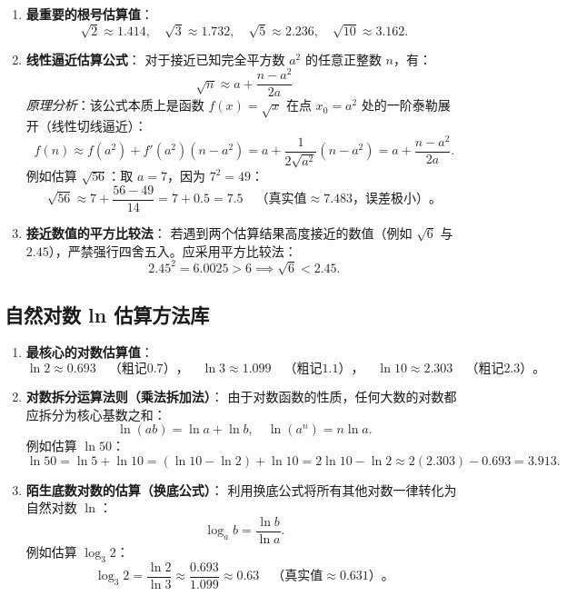 \documentclass[12pt,a4paper]{ctexart}
\begin{document}
\begin{enumerate}[label=\arabic*. , leftmargin=2em, itemsep=1.2em, topsep=0.2em]
  \item \textbf{最重要的根号估算值}：
  \[
  \sqrt{2} \approx 1.414,\quad \sqrt{3} \approx 1.732,\quad \sqrt{5} \approx 2.236,\quad \sqrt{10} \approx 3.162.
  \]
  \item \textbf{线性逼近估算公式}：
  对于接近已知完全平方数 \(a^2\) 的任意正整数 \(n\)，有：
  \[
  \sqrt{n} \approx a + \frac{n - a^2}{2a}
  \]
  \textit{原理分析}：该公式本质上是函数 \(f(x) = \sqrt{x}\) 在点 \(x_0 = a^2\) 处的一阶泰勒展开（线性切线逼近）：
  \[
  f(n) \approx f(a^2) + f'(a^2)(n - a^2) = a + \frac{1}{2\sqrt{a^2}}(n - a^2) = a + \frac{n-a^2}{2a}.
  \]
  例如估算 \(\sqrt{56}\)：取 \(a = 7\)，因为 \(7^2 = 49\)：
  \[
  \sqrt{56} \approx 7 + \frac{56-49}{14} = 7 + 0.5 = 7.5 \quad （真实值 \approx 7.483，误差极小）。
  \]
  \item \textbf{接近数值的平方比较法}：
  若遇到两个估算结果高度接近的数值（例如 \(\sqrt{6}\) 与 \(2.45\)），严禁强行四舍五入。应采用平方比较法：
  \[
  2.45^2 = 6.0025 > 6 \implies \sqrt{6} < 2.45.
  \]
\end{enumerate}

\subsection{自然对数 ln 估算方法库}
\begin{enumerate}[label=\arabic*. , leftmargin=2em, itemsep=1.2em, topsep=0.2em]
  \item \textbf{最核心的对数估算值}：
  \[
  \ln 2 \approx 0.693 \quad （粗记 0.7），\quad \ln 3 \approx 1.099 \quad （粗记 1.1），\quad \ln 10 \approx 2.303 \quad （粗记 2.3）。
  \]
  \item \textbf{对数拆分运算法则（乘法拆加法）}：
  由于对数函数的性质，任何大数的对数都应拆分为核心基数之和：
  \[
  \ln(ab) = \ln a + \ln b,\quad \ln(a^n) = n\ln a.
  \]
  例如估算 \(\ln 50\)：
  \[
  \ln 50 = \ln 5 + \ln 10 = (\ln 10 - \ln 2) + \ln 10 = 2\ln 10 - \ln 2 \approx 2(2.303) - 0.693 = 3.913.
  \]
  \item \textbf{陌生底数对数的估算（换底公式）}：
  利用换底公式将所有其他对数一律转化为自然对数 \(\ln\)：
  \[
  \log_a b = \frac{\ln b}{\ln a}.
  \]
  例如估算 \(\log_3 2\)：
  \[
  \log_3 2 = \frac{\ln 2}{\ln 3} \approx \frac{0.693}{1.099} \approx 0.63 \quad （真实值 \approx 0.631）。
  \]
\end{enumerate}
\end{document}
